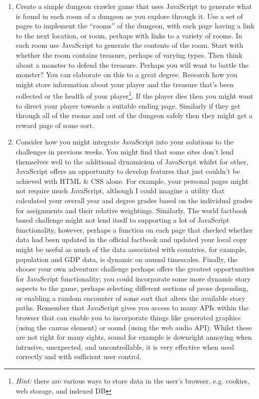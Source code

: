 \documentclass[10pt, a4paper, twosize]{article}
\begin{document}
\begin{enumerate}
\item Create a simple dungeon crawler game that uses JavaScript to generate what is found in each room of a dungeon as you explore through it. Use a set of pages to implement the ``rooms'' of the dungeon, with each page having a link to the next location, or room, perhaps with links to a variety of rooms. In each room use JavaScript to generate the contents of the room. Start with whether the room contains treasure, perhaps of varying types. Then think about a monster to defend the treasure. Perhaps you will want to battle the monster? You can elaborate on this to a great degree. Research how you might store information about your player and the treasure that's been collected or the health of your player\footnote{\emph{Hint:} there are various ways to store data in the user's browser, e.g. cookies, web storage, and indexed DB}. If the player dies then you might want to direct your player towards a suitable ending page. Similarly if they get through all of the rooms and out of the dungeon safely then they might get a reward page of some sort.
\item Consider how you might integrate JavaScript into your solutions to the challenges in previous weeks. You might find that some sites don't lend themselves well to the additional dynamicism of JavaScript whilst for other, JavaScript offers an opportunity to develop features that just couldn't be achieved with HTML \& CSS alone. For example, your personal pages might not require much JavaScript, although I could imagine a utility that calculated your overall year and degree grades based on the individual grades for assignments and their relative weightings. Similarly, The world factbook based challenge might not lend itself to supporting a lot of JavaScript functionality, however, perhaps a function on each page that checked whether data had been updated in the official factbook and updated your local copy might be useful as much of the data associated with countries, for example, population and GDP data, is dynamic on annual timescales. Finally, the choose your own adventure challenge perhaps offers the greatest opportunities for JavaScript functionality; you could incorporate some more dynamic story aspects to the game, perhaps selecting different sections of prose depending, or enabling a random encounter of some sort that alters the available story paths. Remember that JavaScript gives you access to many APIs within the browser that can enable you to incorporate things like generated graphics (using the canvas element) or sound (using the web audio API). Whilst these are not right for many sights, sound for example is downright annoying when intrusive, unexpected, and uncontrollable, it is very effective when used correctly and with sufficient user control.
\end{enumerate}
\end{document}
